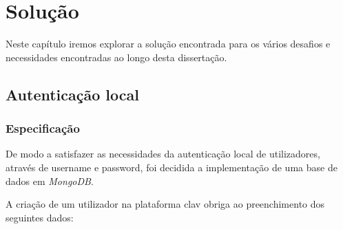 \cleardoublepage
\chapter{Solução} \label{capituloSolucoes}

Neste capítulo iremos explorar a solução encontrada para os vários desafios e necessidades encontradas ao longo desta dissertação.
\vspace{-4mm}
\section{Autenticação local}
\vspace{-4mm}
\subsection{Especificação} \label{especificacaoAuthLocal}
\vspace{-3mm}
De modo a satisfazer as necessidades da autenticação local de utilizadores, através de username e password, foi decidida a implementação de uma base de dados em \emph{MongoDB}.

A criação de um utilizador na plataforma \gls{clav} obriga ao preenchimento dos seguintes dados:

